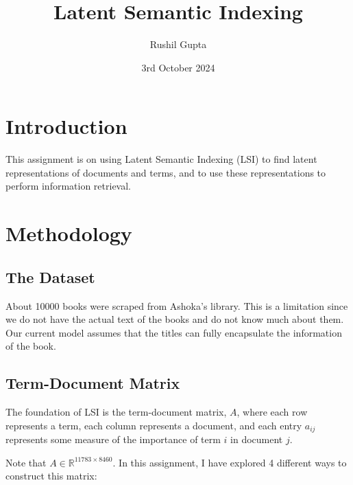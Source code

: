 \documentclass[a4paper, 12pt]{article}
\title{\Large\textbf{Latent Semantic Indexing}}
\author{Rushil Gupta}
\date{3rd October 2024}
\begin{document}
\maketitle
\section*{Introduction}
This assignment is on using Latent Semantic Indexing (LSI) to find latent representations of documents and terms, and to use these representations to perform information retrieval.


\section*{Methodology}

\subsection*{The Dataset}
About 10000 books were scraped from Ashoka's library. This is a limitation since we do not have the actual text of the books and do not know much about them. Our current model assumes that the titles can fully encapsulate the information of the book.

\subsection*{Term-Document Matrix}

The foundation of LSI is the term-document matrix, $A$, where each row represents a term, each column represents a document, and each entry $a_{ij}$ represents some measure of the importance of term $i$ in document $j$. 

\vspace{0.5cm}
Note that $A \in \mathbb{R}^{11783 \times 8460}$. In this assignment, I have explored 4 different ways to construct this matrix:

\vspace{0.5cm}
\end{document}

